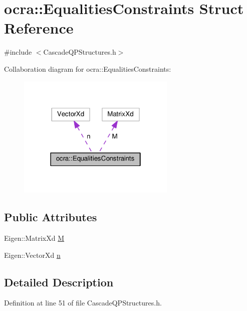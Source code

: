 \hypertarget{structocra_1_1EqualitiesConstraints}{}\section{ocra\+:\+:Equalities\+Constraints Struct Reference}
\label{structocra_1_1EqualitiesConstraints}


{\ttfamily \#include $<$Cascade\+Q\+P\+Structures.\+h$>$}



Collaboration diagram for ocra\+:\+:Equalities\+Constraints\+:
\nopagebreak
\begin{figure}[H]
\begin{center}
\leavevmode
\includegraphics[width=214pt]{d3/d06/structocra_1_1EqualitiesConstraints__coll__graph}
\end{center}
\end{figure}
\subsection*{Public Attributes}
\begin{DoxyCompactItemize}
\item 
Eigen\+::\+Matrix\+Xd \hyperlink{structocra_1_1EqualitiesConstraints_a948420ad39defa889f402d30041a3521}{M}
\item 
Eigen\+::\+Vector\+Xd \hyperlink{structocra_1_1EqualitiesConstraints_a03425f2d5d16dbb6a0c7da036a2fee77}{n}
\end{DoxyCompactItemize}


\subsection{Detailed Description}


Definition at line 51 of file Cascade\+Q\+P\+Structures.\+h.



